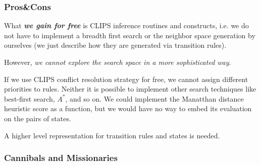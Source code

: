\documentclass[xcolor={usenames,dvipsnames,svgnames}, compress]{beamer}
\begin{document}
\begin{frame}
  \frametitle{Pros\&Cons}
  What \textbf{\emph{we gain for free}} is CLIPS inference routines and constructs,
  i.e. we do not have to implement a breadth first search or the
  neighbor space generation by ourselves (we just describe how they are generated
  via transition rules).\par\bigskip
  
  However, \emph{we cannot explore the search space in a more sophisticated way}.\par
  
  If we use CLIPS conflict resolution strategy for free, we cannot
  assign different priorities to rules. Neither it is possible to
  implement other search techniques like best-first search, $A^{*}$,
  and so on. We could implement the Manatthan distance heuristic
  score as a function, but we would have no way to embed its
  evaluation on the pairs of states.\par\bigskip

  A higher level representation for transition rules and states is
  needed.
\end{frame}

\begin{frame}
  \frametitle{Cannibals and Missionaries}
  
\end{frame}
\end{document}
